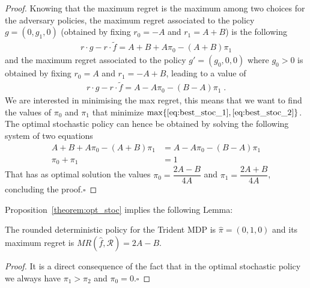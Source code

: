 \begin{proof}
Knowing that the maximum regret is the maximum among two choices for the adversary policies, the maximum regret associated to the policy $g =(0, g_1, 0)$ (obtained by fixing $r_0 = -A$ and $r_1 = A+B$) is the following
\begin{align}
r \cdot g - r \cdot \tilde{f} = A + B +A \pi_0 -(A+B)\pi_1 \label{eq:best_stoc_1}
\end{align}   
and the maximum regret associated to the policy $g' = (g_0, 0, 0)$ where $g_0 > 0$ is obtained by fixing $r_0 = A$ and $r_1 = -A+B$, leading to a value of
\begin{align}
r \cdot g - r \cdot \tilde{f}  = A - A \pi_0 -(B-A)\pi_1 \label{eq:best_stoc_2}\;.
\end{align}   
We are interested in minimising the max regret, this means that we want to find the values of $\pi_0$ and $\pi_1$ that minimize $\max \{\eqref{eq:best_stoc_1}, \eqref{eq:best_stoc_2}\}$. The optimal stochastic policy can hence be obtained by solving the following system of two equations 
\begin{align*}
A + B +A \pi_0 -(A+B)\pi_1 &= A - A \pi_0 -(B-A)\pi_1\\
\pi_0+\pi_1 &= 1
\end{align*} 
That has as optimal solution the values $\pi_{0}=\dfrac{2A - B}{4A}$ and $\pi_{1}=\dfrac{2A + B}{4A}$, concluding the proof.$\square$
\end{proof}


Proposition~\ref{theorem:opt_stoc} implies the following Lemma:
\begin{lemma}\label{lemma:heur_policy}
The rounded deterministic policy for the Trident MDP is $\hat{\pi} = (0, 1, 0)$ %
and its maximum regret is $MR(\hat{f}, \mathcal{R}) = 2A-B$.
\end{lemma}
\begin{proof}
It is a direct consequence of the fact that in the optimal stochastic policy we always have $\pi_1 > \pi_2$ and $\pi_0 = 0$.$\square$
\end{proof}




